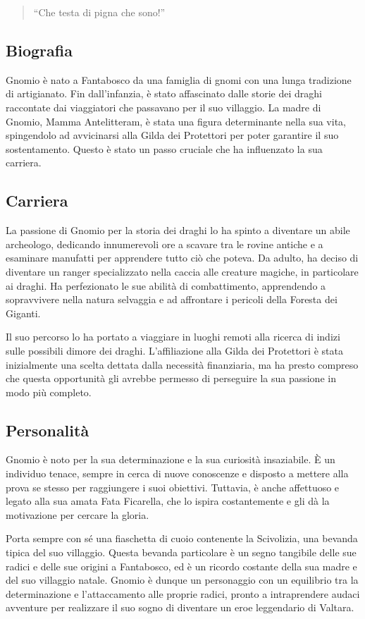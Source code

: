 \begin{quote}
``Che testa di pigna che sono!''
\end{quote}

\subsection{Biografia}\label{biografia}


Gnomio è nato a Fantabosco da una famiglia di gnomi con una lunga
tradizione di artigianato. Fin dall'infanzia, è stato affascinato dalle
storie dei draghi raccontate dai viaggiatori che passavano per il suo
villaggio. La madre di Gnomio, Mamma Antelitteram, è stata una figura
determinante nella sua vita, spingendolo ad avvicinarsi alla Gilda dei
Protettori per poter garantire il suo sostentamento. Questo è stato un
passo cruciale che ha influenzato la sua carriera.

\subsection{Carriera}\label{carriera}


La passione di Gnomio per la storia dei draghi lo ha spinto a diventare
un abile archeologo, dedicando innumerevoli ore a scavare tra le rovine
antiche e a esaminare manufatti per apprendere tutto ciò che poteva. Da
adulto, ha deciso di diventare un ranger specializzato nella caccia alle
creature magiche, in particolare ai draghi. Ha perfezionato le sue
abilità di combattimento, apprendendo a sopravvivere nella natura
selvaggia e ad affrontare i pericoli della Foresta dei Giganti.

Il suo percorso lo ha portato a viaggiare in luoghi remoti alla ricerca
di indizi sulle possibili dimore dei draghi. L'affiliazione alla Gilda
dei Protettori è stata inizialmente una scelta dettata dalla necessità
finanziaria, ma ha presto compreso che questa opportunità gli avrebbe
permesso di perseguire la sua passione in modo più completo.

\subsection{Personalità}\label{personalituxe0}


Gnomio è noto per la sua determinazione e la sua curiosità insaziabile.
È un individuo tenace, sempre in cerca di nuove conoscenze e disposto a
mettere alla prova se stesso per raggiungere i suoi obiettivi. Tuttavia,
è anche affettuoso e legato alla sua amata Fata Ficarella, che lo ispira
costantemente e gli dà la motivazione per cercare la gloria.

Porta sempre con sé una fiaschetta di cuoio contenente la Scivolizia,
una bevanda tipica del suo villaggio. Questa bevanda particolare è un
segno tangibile delle sue radici e delle sue origini a Fantabosco, ed è
un ricordo costante della sua madre e del suo villaggio natale. Gnomio è
dunque un personaggio con un equilibrio tra la determinazione e
l'attaccamento alle proprie radici, pronto a intraprendere audaci
avventure per realizzare il suo sogno di diventare un eroe leggendario
di Valtara.

